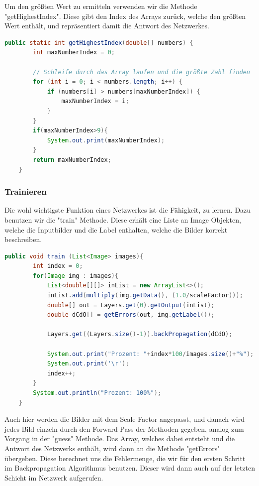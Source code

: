 \documentclass[12pt]{article}
\begin{document}
Um den größten Wert zu ermitteln verwenden wir die Methode "getHighestIndex". Diese gibt den Index des Arrays zurück, welche den größten Wert enthält, und repräsentiert damit die Antwort des Netzwerkes.
\begin{lstlisting}[language=Java]
    public static int getHighestIndex(double[] numbers) {
        int maxNumberIndex = 0;

        // Schleife durch das Array laufen und die größte Zahl finden
        for (int i = 0; i < numbers.length; i++) {
            if (numbers[i] > numbers[maxNumberIndex]) {
                maxNumberIndex = i;
            }
        }
        if(maxNumberIndex>9){
            System.out.print(maxNumberIndex);
        }
        return maxNumberIndex;
    }
\end{lstlisting}

\subsubsection{Trainieren}

Die wohl wichtigste Funktion eines Netzwerkes ist die Fähigkeit, zu lernen. Dazu benutzen wir die "train" Methode. Diese erhält eine Liste an Image Objekten, welche die Inputbilder und die Label enthalten, welche die Bilder korrekt beschreiben.
\begin{lstlisting}[language=Java]
public void train (List<Image> images){
        int index = 0;
        for(Image img : images){
            List<double[][]> inList = new ArrayList<>();
            inList.add(multiply(img.getData(), (1.0/scaleFactor)));
            double[] out = Layers.get(0).getOutput(inList);
            double dCdO[] = getErrors(out, img.getLabel());

            Layers.get((Layers.size()-1)).backPropagation(dCdO);

            System.out.print("Prozent: "+index*100/images.size()+"%");
            System.out.print('\r');
            index++;
        }
        System.out.println("Prozent: 100%");
    }
\end{lstlisting}
Auch hier werden die Bilder mit dem Scale Factor angepasst, und danach wird jedes Bild einzeln durch den Forward Pass der Methoden gegeben, analog zum Vorgang in der "guess" Methode. Das Array, welches dabei entsteht und die Antwort des Netzwerks enthält, wird dann an die Methode "getErrors" übergeben. Diese berechnet uns die Fehlermenge, die wir für den ersten Schritt im Backpropagation Algorithmus benutzen. Dieser wird dann auch auf der letzten Schicht im Netzwerk aufgerufen.
\end{document}
